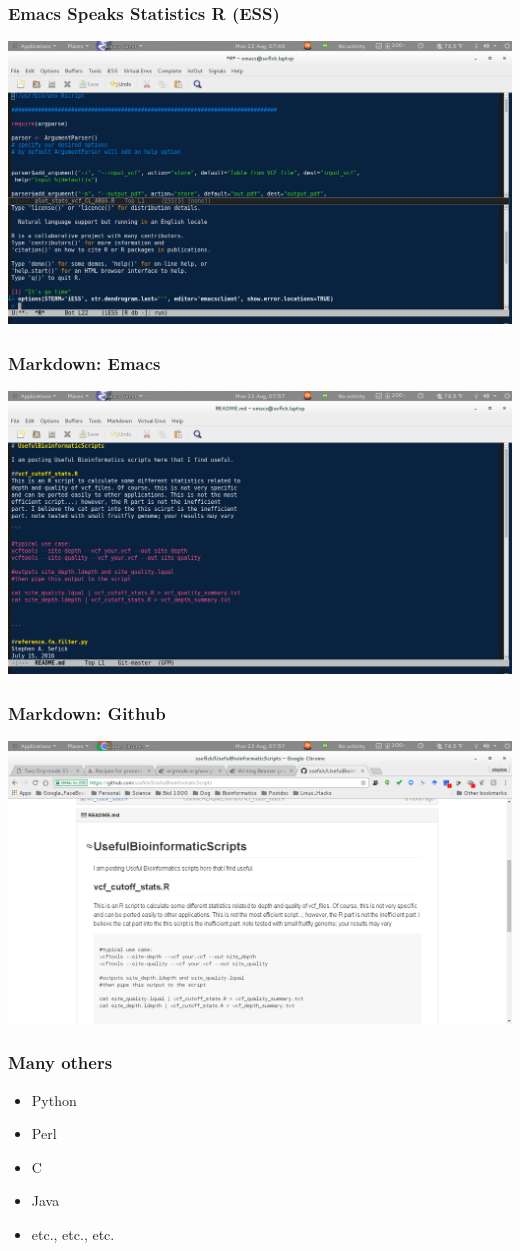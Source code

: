 \documentclass[t,10pt]{beamer}
\begin{document}
\begin{frame}
\frametitle{Emacs Speaks Statistics R (ESS)}
\label{sec-3-3}

\includegraphics[width=.9\linewidth]{./ESS_IDE.png}
\end{frame}
\begin{frame}
\frametitle{Markdown: Emacs}
\label{sec-3-4}

\includegraphics[width=.9\linewidth]{./README_md.png}
\end{frame}
\begin{frame}
\frametitle{Markdown: Github}
\label{sec-3-5}

\includegraphics[width=.9\linewidth]{./README_md_GITGUB.png}
\end{frame}
\begin{frame}
\frametitle{Many others}
\label{sec-3-6}

\begin{itemize}
\item Python
\item Perl
\item C
\item Java
\item etc., etc., etc.
\end{itemize}
\end{frame}
\end{document}
